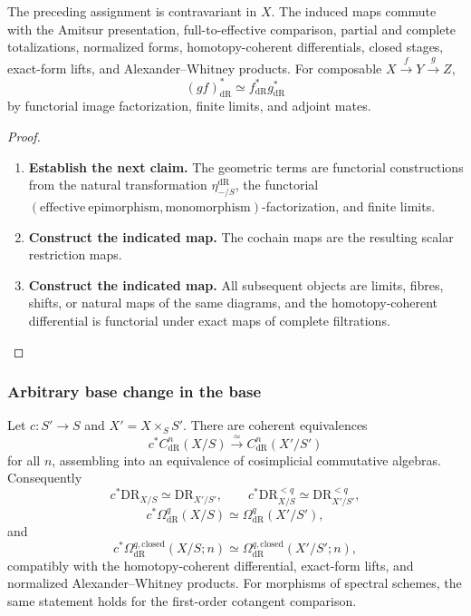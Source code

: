 \begin{theorem}
\label{thm:contravariant-functoriality-expanded}
The preceding assignment is contravariant in \(X\). The induced maps
commute with the Amitsur presentation, full-to-effective comparison, partial and
complete totalizations, normalized forms, homotopy-coherent differentials, closed stages,
exact-form lifts, and Alexander--Whitney products. For composable
\(X\xrightarrow fY\xrightarrow gZ\),
\[
  (gf)^*_{\mathrm{dR}}
  \simeq
  f^*_{\mathrm{dR}}g^*_{\mathrm{dR}}
\]
by functorial image factorization, finite limits, and adjoint mates.
\end{theorem}

\begin{proof}
\leavevmode
\begin{enumerate}[label=\textup{(\arabic*)}]
    \item \textbf{Establish the next claim.}
    The geometric terms are functorial constructions from the natural transformation
    \(\eta_{-/S}^{\mathrm{dR}}\), the functorial
    \((\mathrm{effective\ epimorphism},\mathrm{monomorphism})\)-factorization, and finite limits.
    \item \textbf{Construct the indicated map.}
    The
    cochain maps are the resulting scalar restriction maps.
    \item \textbf{Construct the indicated map.}
    All subsequent objects are
    limits, fibres, shifts, or natural maps of the same diagrams, and the homotopy-coherent
    differential is functorial under exact maps of complete filtrations.
\end{enumerate}
\end{proof}

\subsubsection{Arbitrary base change in the base}

\begin{theorem}
\label{thm:parameterized-de-Rham-base-change}
Let \(c:S'\to S\) and \(X'=X\times_SS'\). There are coherent equivalences
\[
  c^*C^n_{\mathrm{dR}}(X/S)
  \xrightarrow{\simeq}
  C^n_{\mathrm{dR}}(X'/S')
\]
for all \(n\), assembling into an equivalence of cosimplicial commutative algebras.
Consequently
\[
  c^*\mathrm{DR}_{X/S}
  \simeq
  \mathrm{DR}_{X'/S'},
  \qquad
  c^*\mathrm{DR}^{<q}_{X/S}
  \simeq
  \mathrm{DR}^{<q}_{X'/S'},
\]
\[
  c^*\Omega^q_{\mathrm{dR}}(X/S)
  \simeq
  \Omega^q_{\mathrm{dR}}(X'/S'),
\]
and
\[
  c^*\Omega^{q,\mathrm{closed}}_{\mathrm{dR}}(X/S;n)
  \simeq
  \Omega^{q,\mathrm{closed}}_{\mathrm{dR}}(X'/S';n),
\]
compatibly with the homotopy-coherent differential, exact-form lifts, and normalized
Alexander--Whitney products. For morphisms of spectral schemes, the same statement
holds for the first-order cotangent comparison.
\end{theorem}

